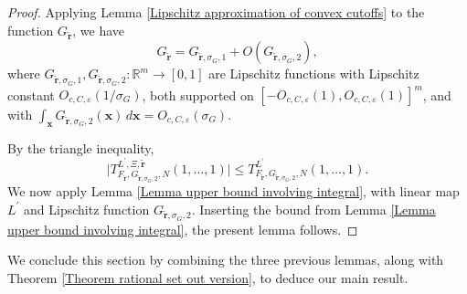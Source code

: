 \documentclass[12pt,a4paper,twoside,reqno]{amsart}
\numberwithin{equation}{section}
\begin{document}
\begin{proof}
Applying Lemma \ref{Lipschitz approximation of convex cutoffs} to the function $G_{\widetilde{\mathbf{r}}}$, we have \[G_{\widetilde{\mathbf{r}}} = G_{\widetilde{\mathbf{r}}, \sigma_G,1} + O(G_{\widetilde{\mathbf{r}}, \sigma_G,2}),\] where $G_{\widetilde{\mathbf{r}}, \sigma_G,1}, G_{\widetilde{\mathbf{r}}, \sigma_G,2}:\mathbb{R}^{m} \longrightarrow [0,1]$ are Lipschitz functions with Lipschitz constant $O_{c,C,\varepsilon}(1/\sigma _G)$, both supported on $[-O_{c,C,\varepsilon}(1),O_{c,C,\varepsilon}(1)]^{m}$, and with $\int_{\mathbf{x}} G_{\widetilde{\mathbf{r}}, \sigma_G,2}(\mathbf{x}) \, d\mathbf{x} = O_{c,C,\varepsilon}(\sigma_G)$. 

By the triangle inequality, \[ \vert T_{F_{\widetilde{\mathbf{r}}},G_{\widetilde{\mathbf{r}},\sigma_G,2},N}^{L^\prime,\Xi,\widetilde{\mathbf{r}}}(1,\dots,1)\vert \leqslant T_{F_{\widetilde{\mathbf{r}}},G_{\widetilde{\mathbf{r}},\sigma_G,2},N}^{L^\prime}(1,\dots,1).\] We now apply Lemma \ref{Lemma upper bound involving integral}, with linear map $L^\prime$ and Lipschitz function $G_{\widetilde{\mathbf{r}}, \sigma_G,2}$. Inserting the bound from Lemma \ref{Lemma upper bound involving integral}, the present lemma follows. 
\end{proof}

We conclude this section by combining the three previous lemmas, along with Theorem \ref{Theorem rational set out version}, to deduce our main result. 
\end{document}
